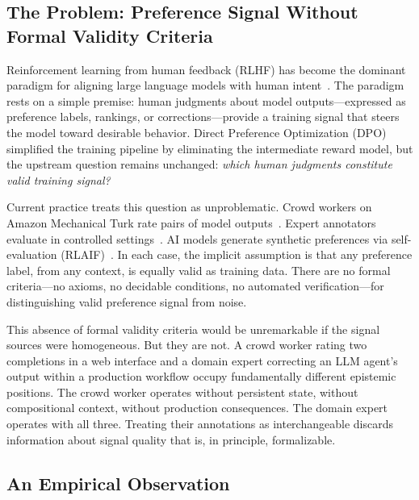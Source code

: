 \documentclass[11pt]{article}
\begin{document}
\subsection{The Problem: Preference Signal Without Formal Validity Criteria}
\label{sec:problem}

Reinforcement learning from human feedback (RLHF) has become the dominant paradigm for aligning large language models with human intent~\citep{christiano2017deep, ouyang2022training}.
The paradigm rests on a simple premise: human judgments about model outputs---expressed as preference labels, rankings, or corrections---provide a training signal that steers the model toward desirable behavior.
Direct Preference Optimization (DPO)~\citep{rafailov2023direct} simplified the training pipeline by eliminating the intermediate reward model, but the upstream question remains unchanged: \emph{which human judgments constitute valid training signal?}

Current practice treats this question as unproblematic.
Crowd workers on Amazon Mechanical Turk rate pairs of model outputs~\citep{ouyang2022training}.
Expert annotators evaluate in controlled settings~\citep{bai2022constitutional}.
AI models generate synthetic preferences via self-evaluation (RLAIF)~\citep{lee2023rlaif}.
In each case, the implicit assumption is that any preference label, from any context, is equally valid as training data.
There are no formal criteria---no axioms, no decidable conditions, no automated verification---for distinguishing valid preference signal from noise.

This absence of formal validity criteria would be unremarkable if the signal sources were homogeneous.
But they are not.
A crowd worker rating two completions in a web interface and a domain expert correcting an LLM agent's output within a production workflow occupy fundamentally different epistemic positions.
The crowd worker operates without persistent state, without compositional context, without production consequences.
The domain expert operates with all three.
Treating their annotations as interchangeable discards information about signal quality that is, in principle, formalizable.

\subsection{An Empirical Observation}
\label{sec:observation}
\end{document}
